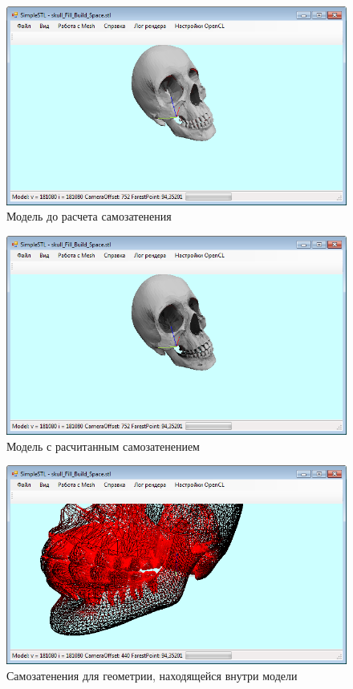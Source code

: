 \begin{figure}
	\center
	\includegraphics[width=1\textwidth]{scull2}
	\caption{Модель до расчета самозатенения}\label{scull2}
\end{figure}
\begin{figure}
	\center
	\includegraphics[width=1\textwidth]{scull1}
	\caption{Модель с расчитанным самозатенением}\label{scull1}
\end{figure}
\begin{figure}
	\center
	\includegraphics[width=1\textwidth]{scull3}
	\caption{Самозатенения для геометрии, находящейся внутри модели}\label{scull3}
\end{figure}
